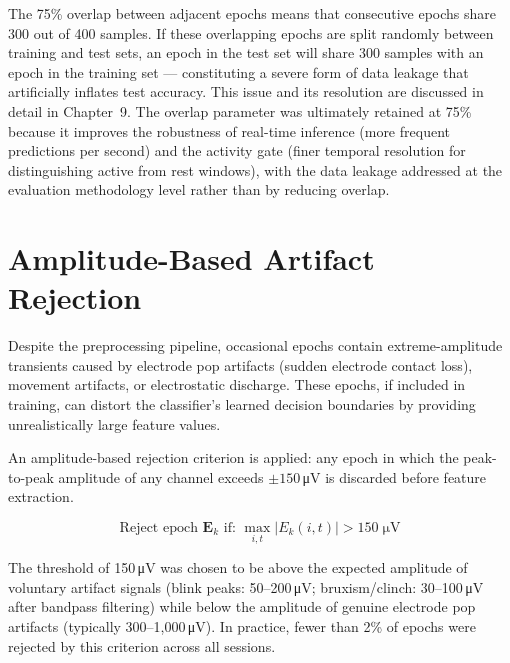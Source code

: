 The 75\% overlap between adjacent epochs means that
consecutive epochs share 300 out of 400 samples. If these
overlapping epochs are split randomly between training and
test sets, an epoch in the test set will share 300 samples
with an epoch in the training set — constituting a severe
form of data leakage that artificially inflates test accuracy.
This issue and its resolution are discussed in detail in
Chapter~9. The overlap parameter was ultimately retained at
75\% because it improves the robustness of real-time inference
(more frequent predictions per second) and the activity gate
(finer temporal resolution for distinguishing active from rest
windows), with the data leakage addressed at the evaluation
methodology level rather than by reducing overlap.

\section{Amplitude-Based Artifact Rejection}
\label{sec:sp_reject}

Despite the preprocessing pipeline, occasional epochs contain
extreme-amplitude transients caused by electrode pop artifacts
(sudden electrode contact loss), movement artifacts, or
electrostatic discharge. These epochs, if included in training,
can distort the classifier's learned decision boundaries by
providing unrealistically large feature values.

An amplitude-based rejection criterion is applied: any epoch
in which the peak-to-peak amplitude of any channel exceeds
$\pm 150$\,\si{\micro\volt} is discarded before feature
extraction.

\begin{equation}
\text{Reject epoch } \mathbf{E}_k \text{ if: }
\max_{i,t}\left|E_k(i,t)\right| > 150\;\si{\micro\volt}
\label{eq:amplitude_reject}
\end{equation}

The threshold of 150\,\si{\micro\volt} was chosen to be above
the expected amplitude of voluntary artifact signals
(blink peaks: 50--200\,\si{\micro\volt}; bruxism/clinch:
30--100\,\si{\micro\volt} after bandpass filtering) while
below the amplitude of genuine electrode pop artifacts
(typically 300--1{,}000\,\si{\micro\volt}). In practice,
fewer than 2\% of epochs were rejected by this criterion
across all sessions.

